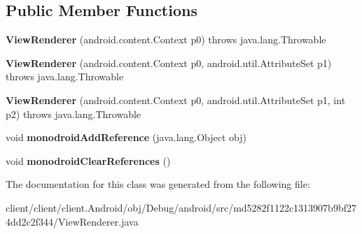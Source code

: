 \subsection*{Public Member Functions}
\begin{DoxyCompactItemize}
\item 
\hypertarget{classmd5282f1122c1313907b9bf274dd2c2f344_1_1ViewRenderer_a4a049a81798041ee75e5b5da8c68bd21}{}{\bfseries View\+Renderer} (android.\+content.\+Context p0)  throws java.\+lang.\+Throwable 	\label{classmd5282f1122c1313907b9bf274dd2c2f344_1_1ViewRenderer_a4a049a81798041ee75e5b5da8c68bd21}

\item 
\hypertarget{classmd5282f1122c1313907b9bf274dd2c2f344_1_1ViewRenderer_a174955b8087cce1d9a0c6e534a8009a4}{}{\bfseries View\+Renderer} (android.\+content.\+Context p0, android.\+util.\+Attribute\+Set p1)  throws java.\+lang.\+Throwable 	\label{classmd5282f1122c1313907b9bf274dd2c2f344_1_1ViewRenderer_a174955b8087cce1d9a0c6e534a8009a4}

\item 
\hypertarget{classmd5282f1122c1313907b9bf274dd2c2f344_1_1ViewRenderer_a0b3095ed487fb179b7830d465284bee2}{}{\bfseries View\+Renderer} (android.\+content.\+Context p0, android.\+util.\+Attribute\+Set p1, int p2)  throws java.\+lang.\+Throwable 	\label{classmd5282f1122c1313907b9bf274dd2c2f344_1_1ViewRenderer_a0b3095ed487fb179b7830d465284bee2}

\item 
\hypertarget{classmd5282f1122c1313907b9bf274dd2c2f344_1_1ViewRenderer_af128048cdb0ecb11d861c34b4fdd654b}{}void {\bfseries monodroid\+Add\+Reference} (java.\+lang.\+Object obj)\label{classmd5282f1122c1313907b9bf274dd2c2f344_1_1ViewRenderer_af128048cdb0ecb11d861c34b4fdd654b}

\item 
\hypertarget{classmd5282f1122c1313907b9bf274dd2c2f344_1_1ViewRenderer_a22ef05535617dc22e50efa0f85a9b326}{}void {\bfseries monodroid\+Clear\+References} ()\label{classmd5282f1122c1313907b9bf274dd2c2f344_1_1ViewRenderer_a22ef05535617dc22e50efa0f85a9b326}

\end{DoxyCompactItemize}


The documentation for this class was generated from the following file\+:\begin{DoxyCompactItemize}
\item 
client/client/client.\+Android/obj/\+Debug/android/src/md5282f1122c1313907b9bf274dd2c2f344/View\+Renderer.\+java\end{DoxyCompactItemize}
